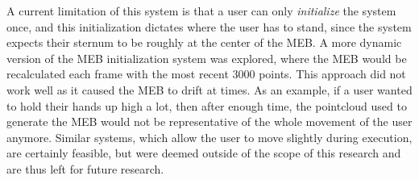 A current limitation of this system is that a user can only \textit{initialize} the system once, and this initialization dictates where the user has to stand, since the system expects their sternum to be roughly at the center of the MEB.
A more dynamic version of the MEB initialization system was explored, where the MEB would be recalculated each frame with the most recent 3000 points.
This approach did not work well as it caused the MEB to drift at times. 
As an example, if a user wanted to hold their hands up high a lot, then after enough time, the pointcloud used to generate the MEB would not be representative of the whole movement of the user anymore.
Similar systems, which allow the user to move slightly during execution, are certainly feasible, but were deemed outside of the scope of this research and are thus left for future research.







